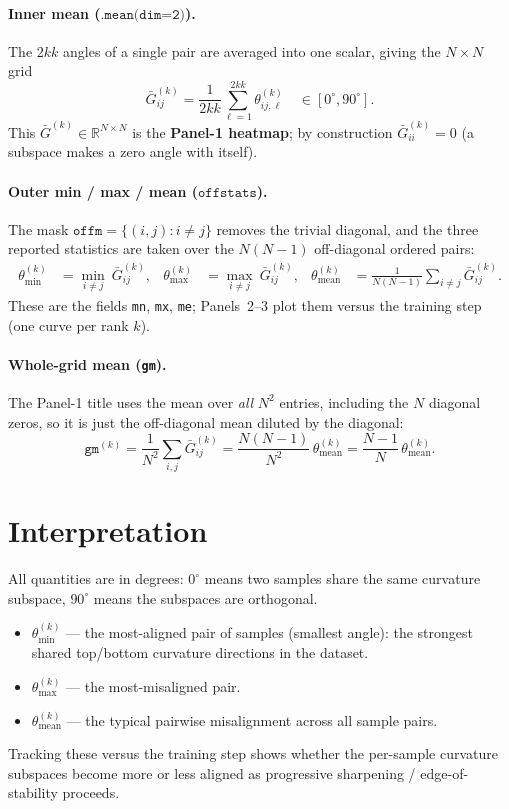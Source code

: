 \documentclass[11pt]{article}
\newcommand{\R}{\mathbb{R}}
\begin{document}
\paragraph{Inner mean ($\texttt{.mean(dim=2)}$).} The $2kk$ angles of a single pair are
averaged into one scalar, giving the $N\times N$ grid
\begin{equation}
  \bar G^{(k)}_{ij}=\frac{1}{2kk}\sum_{\ell=1}^{2kk}\theta^{(k)}_{ij,\ell}
  \quad\in[0^\circ,90^\circ].
\end{equation}
This $\bar G^{(k)}\in\R^{N\times N}$ is the \textbf{Panel-1 heatmap}; by construction
$\bar G^{(k)}_{ii}=0$ (a subspace makes a zero angle with itself).

\paragraph{Outer min / max / mean ($\texttt{offstats}$).} The mask
$\texttt{offm}=\{(i,j):i\ne j\}$ removes the trivial diagonal, and the three reported
statistics are taken over the $N(N-1)$ off-diagonal ordered pairs:
\begin{align}
  \theta^{(k)}_{\min}  &= \min_{i\ne j}\ \bar G^{(k)}_{ij}, &
  \theta^{(k)}_{\max}  &= \max_{i\ne j}\ \bar G^{(k)}_{ij}, &
  \theta^{(k)}_{\mathrm{mean}} &= \frac{1}{N(N-1)}\sum_{i\ne j}\bar G^{(k)}_{ij}.
\end{align}
These are the fields \texttt{mn}, \texttt{mx}, \texttt{me}; Panels~2--3 plot them
versus the training step (one curve per rank $k$).

\paragraph{Whole-grid mean (\texttt{gm}).} The Panel-1 title uses the mean over
\emph{all} $N^2$ entries, including the $N$ diagonal zeros, so it is just the
off-diagonal mean diluted by the diagonal:
\begin{equation}
  \texttt{gm}^{(k)}=\frac{1}{N^2}\sum_{i,j}\bar G^{(k)}_{ij}
  =\frac{N(N-1)}{N^2}\,\theta^{(k)}_{\mathrm{mean}}
  =\frac{N-1}{N}\,\theta^{(k)}_{\mathrm{mean}}.
\end{equation}

\section{Interpretation}

All quantities are in degrees: $0^\circ$ means two samples share the same curvature
subspace, $90^\circ$ means the subspaces are orthogonal.
\begin{itemize}[nosep]
  \item $\theta^{(k)}_{\min}$ --- the most-aligned pair of samples (smallest angle):
        the strongest shared top/bottom curvature directions in the dataset.
  \item $\theta^{(k)}_{\max}$ --- the most-misaligned pair.
  \item $\theta^{(k)}_{\mathrm{mean}}$ --- the typical pairwise misalignment across
        all sample pairs.
\end{itemize}
Tracking these versus the training step shows whether the per-sample curvature
subspaces become more or less aligned as progressive sharpening / edge-of-stability
proceeds.
\end{document}
